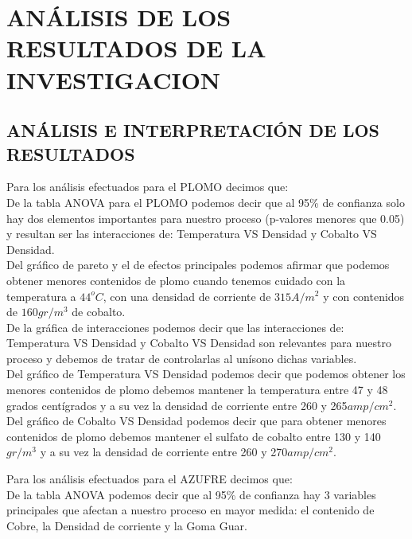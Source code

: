 \chapter{AN\'ALISIS DE LOS RESULTADOS DE LA INVESTIGACION}

\section{AN\'ALISIS E INTERPRETACI\'ON DE LOS RESULTADOS}

Para los an\'alisis efectuados para el PLOMO decimos que: \\

De la tabla ANOVA para el PLOMO podemos decir que al 95\% de confianza solo hay dos elementos importantes para nuestro proceso (p-valores menores que 0.05) y resultan ser las interacciones de: Temperatura VS Densidad y Cobalto VS Densidad.\\

Del gr\'afico de pareto y el de efectos principales podemos afirmar que podemos obtener menores contenidos de plomo cuando tenemos cuidado con la temperatura a $44^oC$, con una densidad de corriente de $315A/m^2$ y con contenidos de $160gr/m^3$ de cobalto.\\

De la gr\'afica de interacciones podemos decir que las interacciones de: Temperatura VS Densidad y Cobalto VS Densidad son relevantes para nuestro proceso y debemos de tratar de controlarlas al un\'isono dichas variables.\\

Del gr\'afico de Temperatura VS Densidad podemos decir que podemos obtener los menores contenidos de plomo debemos mantener la temperatura entre 47 y 48 grados cent\'igrados y a su vez la densidad de corriente entre 260 y 265$amp/cm^2$.\\

Del gr\'afico de Cobalto VS Densidad podemos decir que para obtener menores contenidos de plomo debemos mantener el sulfato de cobalto entre 130 y 140$gr/m^3$ y a su vez la densidad de corriente entre 260 y 270$amp/cm^2$.

Para los an\'alisis efectuados para el AZUFRE decimos que:\\

De la tabla ANOVA podemos decir que al 95\% de confianza hay 3 variables principales que afectan a nuestro proceso en mayor medida: el contenido de Cobre, la Densidad de corriente y la Goma Guar.\\

